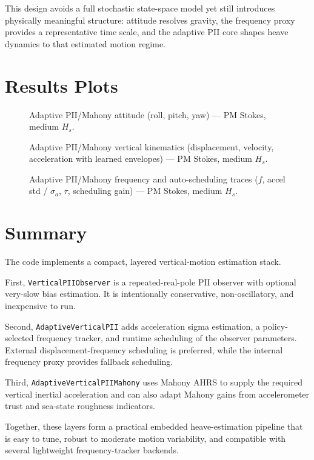 \documentclass[conference]{IEEEtran}
\newcommand{\IncludePGF}[1]{\resizebox{\linewidth}{!}{}}
\begin{document}
This design avoids a full stochastic state-space model yet still introduces
physically meaningful structure: attitude resolves gravity, the frequency
proxy provides a representative time scale, and the adaptive PII core shapes
heave dynamics to that estimated motion regime.

\section{Results Plots}

\begin{figure}[!t]\centering
  \IncludePGF{w3d_nonkalman_pmstokes_medium.pgf}
  \caption{Adaptive PII/Mahony attitude (roll, pitch, yaw) --- PM Stokes, medium $H_s$.}
  \label{fig:w3d_nonkalman_pmstokes_medium_angles}
\end{figure}
\begin{figure}[!t]\centering
  \IncludePGF{w3d_nonkalman_pmstokes_medium_zkin.pgf}
  \caption{Adaptive PII/Mahony vertical kinematics (displacement, velocity, acceleration with learned envelopes) --- PM Stokes, medium $H_s$.}
  \label{fig:w3d_nonkalman_pmstokes_medium_zkin}
\end{figure}
\begin{figure}[!t]\centering
  \IncludePGF{w3d_nonkalman_pmstokes_medium_tuner.pgf}
  \caption{Adaptive PII/Mahony frequency and auto-scheduling traces ($f$, accel std / $\sigma_a$, $\tau$, scheduling gain) --- PM Stokes, medium $H_s$.}
  \label{fig:w3d_nonkalman_pmstokes_medium_tuner}
\end{figure}

\section{Summary}

The code implements a compact, layered vertical-motion estimation stack.

First, \texttt{VerticalPIIObserver} is a repeated-real-pole PII observer with
optional very-slow bias estimation. It is intentionally conservative,
non-oscillatory, and inexpensive to run.

Second, \texttt{AdaptiveVerticalPII} adds acceleration sigma estimation, a
policy-selected frequency tracker, and runtime scheduling of the observer
parameters. External displacement-frequency scheduling is preferred, while the
internal frequency proxy provides fallback scheduling.

Third, \texttt{AdaptiveVerticalPIIMahony} uses Mahony AHRS to supply the
required vertical inertial acceleration and can also adapt Mahony gains from
accelerometer trust and sea-state roughness indicators.

Together, these layers form a practical embedded heave-estimation pipeline
that is easy to tune, robust to moderate motion variability, and compatible
with several lightweight frequency-tracker backends.
\end{document}
